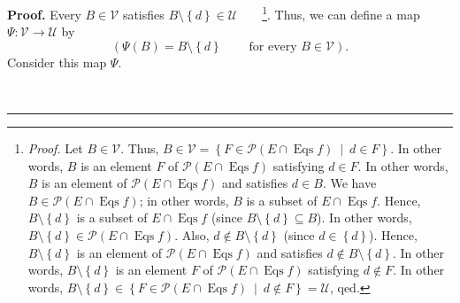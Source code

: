 \documentclass[numbers=enddot,12pt,final,onecolumn,notitlepage]{scrartcl}%
\theoremstyle{definition}
\newenvironment{proof}[1][Proof]{\noindent\textbf{#1.} }{\ \rule{0.5em}{0.5em}}
\newenvironment{verlong}{}{}
\begin{document}
\begin{verlong}
\begin{proof}
Every $B\in\mathcal{V}$ satisfies $B\setminus\left\{  d\right\}
\in\mathcal{U}$\ \ \ \ \footnote{\textit{Proof.} Let $B\in\mathcal{V}$. Thus,
$B\in\mathcal{V}=\left\{  F\in\mathcal{P}\left(  E\cap\operatorname*{Eqs}%
f\right)  \ \mid\ d\in F\right\}  $. In other words, $B$ is an element $F$ of
$\mathcal{P}\left(  E\cap\operatorname*{Eqs}f\right)  $ satisfying $d\in F$.
In other words, $B$ is an element of $\mathcal{P}\left(  E\cap
\operatorname*{Eqs}f\right)  $ and satisfies $d\in B$. We have $B\in
\mathcal{P}\left(  E\cap\operatorname*{Eqs}f\right)  $; in other words, $B$ is
a subset of $E\cap\operatorname*{Eqs}f$. Hence, $B\setminus\left\{  d\right\}
$ is a subset of $E\cap\operatorname*{Eqs}f$ (since $B\setminus\left\{
d\right\}  \subseteq B$). In other words, $B\setminus\left\{  d\right\}
\in\mathcal{P}\left(  E\cap\operatorname*{Eqs}f\right)  $. Also, $d\notin
B\setminus\left\{  d\right\}  $ (since $d\in\left\{  d\right\}  $). Hence,
$B\setminus\left\{  d\right\}  $ is an element of $\mathcal{P}\left(
E\cap\operatorname*{Eqs}f\right)  $ and satisfies $d\notin B\setminus\left\{
d\right\}  $. In other words, $B\setminus\left\{  d\right\}  $ is an element
$F$ of $\mathcal{P}\left(  E\cap\operatorname*{Eqs}f\right)  $ satisfying
$d\notin F$. In other words, $B\setminus\left\{  d\right\}  \in\left\{
F\in\mathcal{P}\left(  E\cap\operatorname*{Eqs}f\right)  \ \mid\ d\notin
F\right\}  =\mathcal{U}$, qed.}. Thus, we can define a map $\Psi
:\mathcal{V}\rightarrow\mathcal{U}$ by%
\[
\left(  \Psi\left(  B\right)  =B\setminus\left\{  d\right\}
\ \ \ \ \ \ \ \ \ \ \text{for every }B\in\mathcal{V}\right)  .
\]
Consider this map $\Psi$.


\end{proof}
\end{verlong}
\end{document}
